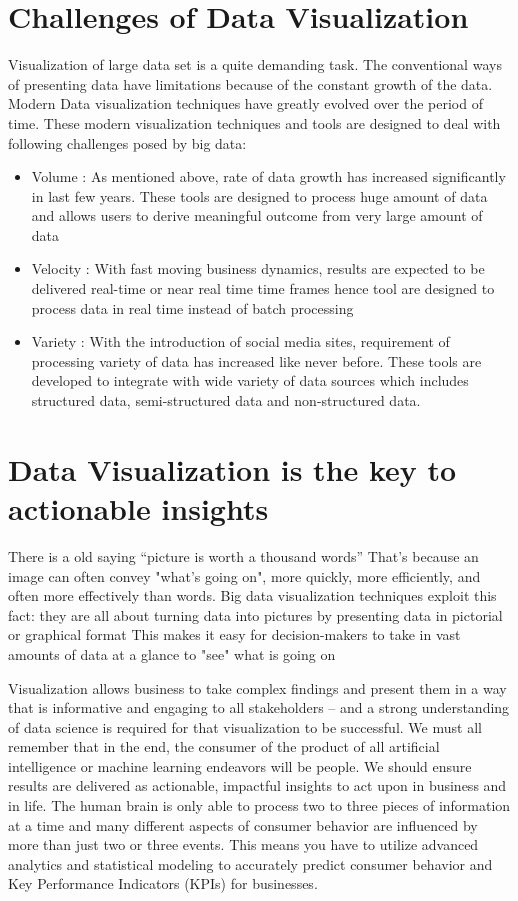\documentclass[sigconf]{acmart}
\begin{document}
\section{Challenges of Data Visualization}

Visualization of large data set is a quite demanding task. The conventional ways of presenting data have limitations because of the constant growth of the data. Modern Data visualization techniques have greatly evolved over the period of time. These modern visualization techniques and tools are designed to deal with following challenges posed by big data:

\begin{itemize}
    \item Volume : As mentioned above, rate of data growth has increased significantly in last few years. These tools are designed to process huge amount of data and allows users to derive meaningful outcome from very large amount of data   
    \item Velocity : With fast moving business dynamics, results are expected to be delivered real-time or near real time time frames hence tool are designed to process data in real time instead of batch processing 
    \item Variety : With the introduction of social media sites, requirement of processing variety of data has increased like never before. These tools are developed to integrate with wide variety of data sources which includes structured data, semi-structured data and non-structured data. 
\end{itemize}


\section{Data Visualization is the key to actionable insights}

There is a old saying  ``picture is worth a thousand words'' That's because an image can often convey "what's going on", more quickly, more efficiently, and often more effectively than words. Big data visualization techniques exploit this fact: they are all about turning data into pictures by presenting data in pictorial or graphical format This makes it easy for decision-makers to take in vast amounts of data at a glance to "see" what is going on

Visualization allows business to take complex findings and present them in a way that is informative and engaging to all stakeholders – and a strong understanding of data science is required for that visualization to be successful. We must all remember that in the end, the consumer of the product of all artificial intelligence or machine learning endeavors will be people. We should ensure results are delivered as actionable, impactful insights to act upon in business and in life. The human brain is only able to process two to three pieces of information at a time and many different aspects of consumer behavior are influenced by more than just two or three events. This means you have to utilize advanced analytics and statistical modeling to accurately predict consumer behavior and Key Performance Indicators (KPIs) for businesses.
\end{document}
